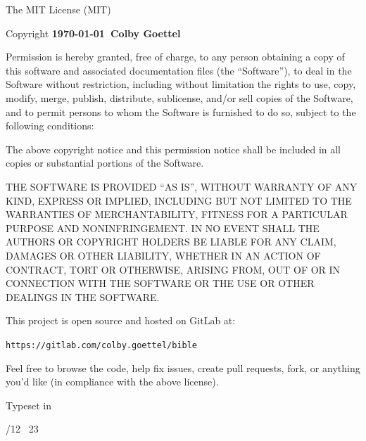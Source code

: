 {\small
    \noindent The MIT License (MIT)

    \noindent Copyright \textbf{\textcopyright\thinspace\justtheyear\today\ Colby Goettel}\medskip

    \noindent Permission is hereby granted, free of charge, to any person obtaining a copy of this software and associated documentation files (the ``Software''), to deal in the Software without restriction, including without limitation the rights to use, copy, modify, merge, publish, distribute, sublicense, and/or sell copies of the Software, and to permit persons to whom the Software is furnished to do so, subject to the following conditions:

    The above copyright notice and this permission notice shall be included in all copies or substantial portions of the Software.

    THE SOFTWARE IS PROVIDED ``AS IS'', WITHOUT WARRANTY OF ANY KIND, EXPRESS OR IMPLIED, INCLUDING BUT NOT LIMITED TO THE WARRANTIES OF MERCHANTABILITY, FITNESS FOR A PARTICULAR PURPOSE AND NONINFRINGEMENT. IN NO EVENT SHALL THE AUTHORS OR COPYRIGHT HOLDERS BE LIABLE FOR ANY CLAIM, DAMAGES OR OTHER LIABILITY, WHETHER IN AN ACTION OF CONTRACT, TORT OR OTHERWISE, ARISING FROM, OUT OF OR IN CONNECTION WITH THE SOFTWARE OR THE USE OR OTHER DEALINGS IN THE SOFTWARE.

    \vfil

    \noindent This project is open source and hosted on GitLab at:\smallskip

    \texttt{https://gitlab.com/colby.goettel/bible}\smallskip

    \noindent Feel free to browse the code, help fix issues, create pull requests, fork, or anything you'd like (in compliance with the above license).

    \vfil

    \noindent Typeset in \XeTeX{}

    /12 \texttimes\ 23
}
